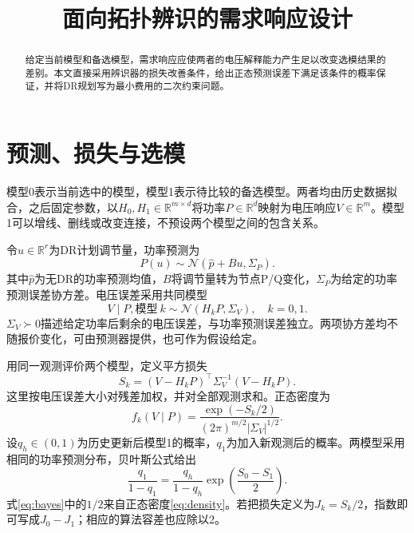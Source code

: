 \documentclass[journal,10pt]{IEEEtran}
\newcommand{\R}{\mathbb R}
\begin{document}
\title{面向拓扑辨识的需求响应设计}
\author{}
\maketitle
\begin{abstract}
给定当前模型和备选模型，需求响应应使两者的电压解释能力产生足以改变选模结果的差别。本文直接采用辨识器的损失改善条件，给出正态预测误差下满足该条件的概率保证，并将DR规划写为最小费用的二次约束问题。
\end{abstract}

\section{预测、损失与选模}
模型0表示当前选中的模型，模型1表示待比较的备选模型。两者均由历史数据拟合，之后固定参数，以$H_0,H_1\in\R^{m\times d}$将功率$P\in\R^d$映射为电压响应$V\in\R^m$。模型1可以增线、删线或改变连接，不预设两个模型之间的包含关系。

令$u\in\R^r$为DR计划调节量，功率预测为
\begin{equation}
P(u)\sim\mathcal N(\widehat p+Bu,\Sigma_P). \label{eq:power}
\end{equation}
其中$\widehat p$为无DR的功率预测均值，$B$将调节量转为节点P/Q变化，$\Sigma_P$为给定的功率预测误差协方差。电压误差采用共同模型
\begin{equation}
V\mid P,\text{模型}~k
\sim\mathcal N(H_kP,\Sigma_V),\quad k=0,1. \label{eq:voltage}
\end{equation}
$\Sigma_V\succ0$描述给定功率后剩余的电压误差，与功率预测误差独立。两项协方差均不随报价变化，可由预测器提供，也可作为假设给定。

用同一观测评价两个模型，定义平方损失
\begin{equation}
S_k=(V-H_kP)^\top\Sigma_V^{-1}(V-H_kP). \label{eq:loss}
\end{equation}
这里按电压误差大小对残差加权，并对全部观测求和。正态密度为
\begin{equation}
f_k(V\mid P)
=\frac{\exp(-S_k/2)}
{(2\pi)^{m/2}|\Sigma_V|^{1/2}}. \label{eq:density}
\end{equation}
设$q_h\in(0,1)$为历史更新后模型1的概率，$q_1$为加入新观测后的概率。两模型采用相同的功率预测分布，贝叶斯公式给出
\begin{equation}
\frac{q_1}{1-q_1}
=\frac{q_h}{1-q_h}\exp\!\left(\frac{S_0-S_1}{2}\right). \label{eq:bayes}
\end{equation}
式\eqref{eq:bayes}中的$1/2$来自正态密度\eqref{eq:density}。若把损失定义为$J_k=S_k/2$，指数即可写成$J_0-J_1$；相应的算法容差也应除以2。
\end{document}
